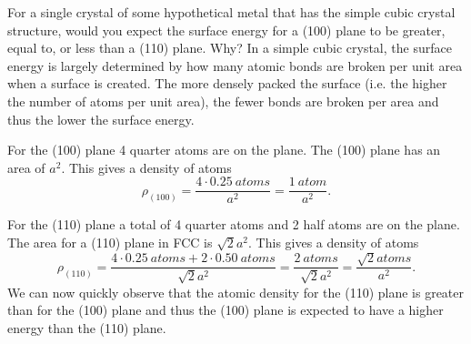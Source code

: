 For a single crystal of some hypothetical metal that has the simple cubic crystal structure, would you expect the surface energy for a (100) plane to be greater, equal to, or less than a (110) plane. Why?
\bigbreak
In a simple cubic crystal, the surface energy is largely determined by how many atomic bonds are broken per unit area when a surface is created. The more densely packed the surface (i.e. the higher the number of atoms per unit area), the fewer bonds are broken per area and thus the lower the surface energy.

For the (100) plane 4 quarter atoms are on the plane. The (100) plane has an area of $a^2$. This gives a density of atoms
\[ 
  \rho_{(100)} = \frac{4 \cdot \qty{0,25}{atoms}}{a^2} = \frac{\qty{1}{atom}}{a^2} 
.\]

For the (110) plane a total of 4 quarter atoms and 2 half atoms are on the plane. The area for a (110) plane in FCC is $\sqrt{2}a^2$. This gives a density of atoms
\[ 
  \rho_{(110)} = \frac{4 \cdot \qty{0,25}{atoms} + 2 \cdot \qty{0,50}{atoms}}{\sqrt{2}a^2} = \frac{\qty{2}{atoms}}{\sqrt{2}a^2} = \frac{\sqrt{2} \unit{atoms}}{a^2}
.\]
We can now quickly observe that the atomic density for the (110) plane is greater than for the (100) plane and thus the (100) plane is expected to have a higher energy than the (110) plane.

